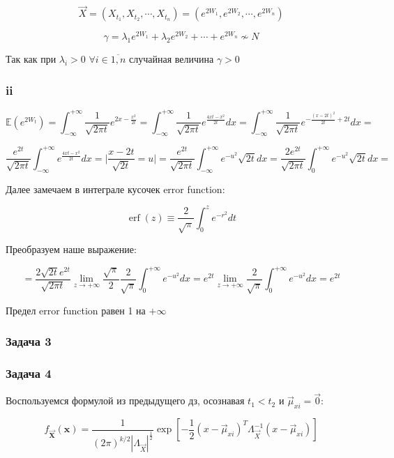 \documentclass[a4paper,12pt]{article}
\def \mbb{\mathbb}
\def \E{\mbb{E}}
\begin{document}
 \[ \vec{X} = \left( X_{t_1}, X_{t_2}, \cdots, X_{t_n} \right) = \left( e^{2W_1}, e^{2W_2}, \cdots, e^{2W_n} \right)  \]
 
 \[ \gamma =  \lambda_1 e^{2W_1} + \lambda_2 e^{2W_2} + \cdots +  e^{2W_n} \not\sim N \]
 
Так как при $ \lambda_i > 0$ $ \forall i \in \overline{1,n} $  случайная величина $ \gamma > 0 $

\subsubsection{ii}

\[ \E(e^{2W_t})  = \int_{-\infty}^{+\infty} \frac{1}{\sqrt{2\pi t}}  e^{2x - \frac{x^2}{2t}} = \int_{-\infty}^{+\infty} \frac{1}{\sqrt{2\pi t}}  e^{\frac{4xt - x^2}{2t}} dx = \int_{-\infty}^{+\infty} \frac{1}{\sqrt{2\pi t}}  e^{-\frac{(x-2t)^2}{2t} + 2t} dx = \]

\[ \frac{e^{2t}}{\sqrt{2\pi t}}  \int_{-\infty}^{+\infty}   e^{\frac{4xt - x^2}{2t}} dx = \Biggr| \frac{x - 2t}{\sqrt{2t}} = u \Biggr| =  \frac{e^{2t}}{\sqrt{2\pi t}}  \int_{-\infty}^{+\infty}  e^{-u^2}  \sqrt{2t}  dx = \frac{2 e^{2t}}{\sqrt{2\pi t}}  \int_{0}^{+\infty}  e^{-u^2}  \sqrt{2t}  dx = \]

Далее замечаем в интеграле кусочек error function:

\[
\operatorname{erf}(z) \equiv \frac{2}{\sqrt{\pi}} \int_{0}^{z} e^{-r^{2}} d t
\]

Преобразуем наше выражение:

\[ =  \frac{2 \sqrt{2t} e^{2t}}{\sqrt{2\pi t}}  \lim\limits_{z \to +\infty} \frac{\sqrt{\pi}}{2} \frac{2}{\sqrt{\pi}} \int_{0}^{+\infty} e^{-u^2}   dx = e^{2t} \lim\limits_{z \to +\infty}  \frac{2}{\sqrt{\pi}} \int_{0}^{+\infty} e^{-u^2}   dx = e^{2t} \]

Предел error function равен 1 на $ +\infty $

\subsubsection{Задача 3}


\subsubsection{Задача 4}

Воспользуемся формулой из предыдущего дз, осознавая $ t_1 < t_2 $ и $ \vec{\mu}_{xi} = \vec{0  } $:

\[
f_{\mathbf{\vec{X}}}(\boldsymbol{x})=\frac{1}{(2 \pi)^{k / 2}\left|\Lambda_{\vec{X}}\right|^{\frac{1}{2}}} \exp \left[-\frac{1}{2}\left(x-\vec{\mu}_{xi}\right)^T\Lambda_{\vec{X}}^{-1}\left(x-\vec{\mu}_{xi} \right)\right]
\]
\end{document}
